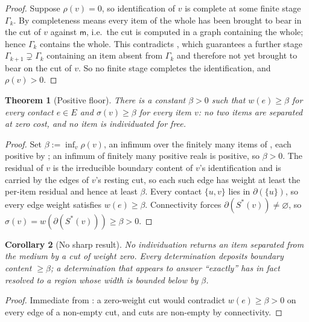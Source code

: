 \documentclass[11pt,twocolumn,a4paper]{article}
\theoremstyle{dirthm}
\newtheorem{theorem}{Theorem}[section]
\newtheorem{corollary}[theorem]{Corollary}
\theoremstyle{definition}
\theoremstyle{remark}
\newcommand{\Gph}{\Gamma}
\newcommand{\E}{E}
\newcommand{\wt}{w}
\newcommand{\med}{\mathsf{m}}
\newcommand{\flo}{\beta}
\newcommand{\cut}{\partial}
\newcommand{\str}{\sigma}
\newcommand{\res}{\rho}
\newcommand{\set}[1]{\{#1\}}
\begin{document}
\begin{proof}
Suppose $\res(v)=0$, so identification of $v$ is complete at some finite
stage $\Gph_k$. By  completeness means every item of the
whole has been brought to bear in the cut of $v$ against $\med$, i.e.\ the
cut is computed in a graph containing the whole; hence $\Gph_k$ contains the
whole. This contradicts , which guarantees a further
stage $\Gph_{k+1}\supsetneq\Gph_k$ containing an item absent from $\Gph_k$
and therefore not yet brought to bear on the cut of $v$. So no finite stage
completes the identification, and $\res(v)>0$.
\end{proof}

\begin{theorem}[Positive floor]
\label{thm:floor}
There is a constant $\flo>0$ such that $\wt(e)\ge\flo$ for every contact
$e\in\E$ and $\str(v)\ge\flo$ for every item $v$: no two items are separated
at zero cost, and no item is individuated for free.
\end{theorem}

\begin{proof}
Set $\flo:=\inf_v\res(v)$, an infimum over the finitely many items of
, each positive by ; an infimum of
finitely many positive reals is positive, so $\flo>0$. The residual of $v$ is
the irreducible boundary content of $v$'s identification and is carried by
the edges of $v$'s resting cut, so each such edge has weight at least the
per-item residual and hence at least $\flo$. Every contact $\set{u,v}$ lies
in $\cut(\set{u})$, so every edge weight satisfies $\wt(e)\ge\flo$.
Connectivity forces $\cut(S^{\ast}(v))\neq\varnothing$, so
$\str(v)=\wt(\cut(S^{\ast}(v)))\ge\flo>0$.
\end{proof}

\begin{corollary}[No sharp result]
\label{cor:no-sharp}
No individuation returns an item separated from the medium by a cut of
weight zero. Every determination deposits boundary content $\ge\flo$; a
determination that appears to answer ``exactly'' has in fact resolved to a
region whose width is bounded below by $\flo$.
\end{corollary}

\begin{proof}
Immediate from : a zero-weight cut would contradict
$\wt(e)\ge\flo>0$ on every edge of a non-empty cut, and cuts are non-empty by
connectivity.
\end{proof}
\end{document}

